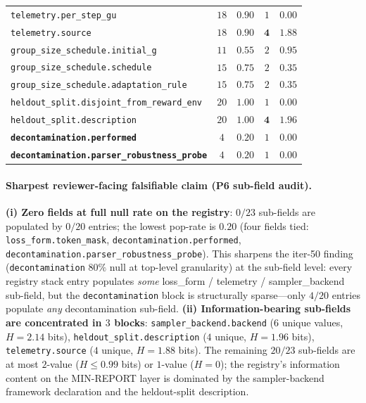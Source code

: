 \documentclass{article}
\begin{document}
\begin{table}[t]
\begin{tabular}{lcccc}
\texttt{telemetry.per\_step\_gu}              & $18$ & $0.90$ & $1$ & $0.00$ \\
\texttt{telemetry.source}                     & $18$ & $0.90$ & $\mathbf{4}$ & $\mathbf{1.88}$ \\
\texttt{group\_size\_schedule.initial\_g}      & $11$ & $0.55$ & $2$ & $0.95$ \\
\texttt{group\_size\_schedule.schedule}        & $15$ & $0.75$ & $2$ & $0.35$ \\
\texttt{group\_size\_schedule.adaptation\_rule}& $15$ & $0.75$ & $2$ & $0.35$ \\
\texttt{heldout\_split.disjoint\_from\_reward\_env} & $20$ & $1.00$ & $1$ & $0.00$ \\
\texttt{heldout\_split.description}           & $20$ & $1.00$ & $\mathbf{4}$ & $\mathbf{1.96}$ \\
\textbf{\texttt{decontamination.performed}}   & $4$  & $\mathbf{0.20}$ & $1$ & $0.00$ \\
\textbf{\texttt{decontamination.parser\_robustness\_probe}} & $4$ & $\mathbf{0.20}$ & $1$ & $0.00$ \\
\bottomrule
\end{tabular}
\end{table}

\paragraph{Sharpest reviewer-facing falsifiable claim (P6 sub-field audit).}
\textbf{(i) Zero fields at full null rate on the registry}: $0/23$
sub-fields are populated by $0/20$ entries; the lowest pop-rate is
$0.20$ (four fields tied: \texttt{loss\_form.token\_mask},
\texttt{decontamination.performed}, \texttt{decontamination.parser\_robustness\_probe}).
This sharpens the iter-50 finding (\texttt{decontamination} $80\%$ null
at top-level granularity) at the sub-field level: every registry stack
entry populates \emph{some} loss\_form / telemetry / sampler\_backend
sub-field, but the \texttt{decontamination} block is structurally
sparse---only $4/20$ entries populate \emph{any} decontamination
sub-field. \textbf{(ii) Information-bearing sub-fields are concentrated
in $3$ blocks}: \texttt{sampler\_backend.backend} ($6$ unique values,
$H = 2.14$ bits), \texttt{heldout\_split.description} ($4$ unique,
$H = 1.96$ bits), \texttt{telemetry.source} ($4$ unique, $H = 1.88$
bits). The remaining $20/23$ sub-fields are at most $2$-value ($H \le
0.99$ bits) or $1$-value ($H = 0$); the registry's information content
on the MIN-REPORT layer is dominated by the sampler-backend framework
declaration and the heldout-split description.
\end{document}
